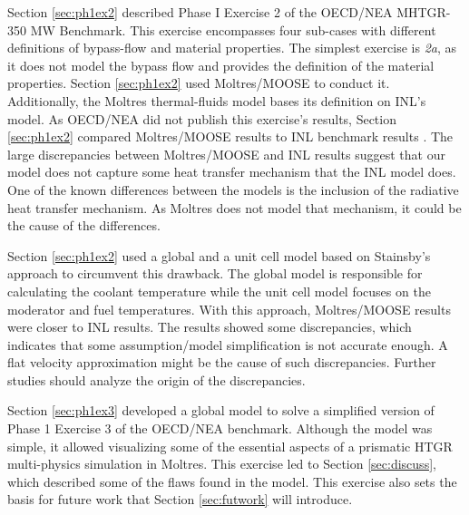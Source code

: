 Section \ref{sec:ph1ex2} described Phase I Exercise 2 of the OECD/NEA MHTGR-350 MW Benchmark.
This exercise encompasses four sub-cases with different definitions of bypass-flow and material properties.
The simplest exercise is \textit{2a}, as it does not model the bypass flow and provides the definition of the material properties.
Section \ref{sec:ph1ex2} used Moltres/MOOSE to conduct it.
Additionally, the Moltres thermal-fluids model bases its definition on INL's model.
As OECD/NEA did not publish this exercise’s results, Section \ref{sec:ph1ex2} compared Moltres/MOOSE results to INL benchmark results \cite{strydom_inl_2013}.
The large discrepancies between Moltres/MOOSE and INL results suggest that our model does not capture some heat transfer mechanism that the INL model does.
One of the known differences between the models is the inclusion of the radiative heat transfer mechanism.
As Moltres does not model that mechanism, it could be the cause of the differences.

Section \ref{sec:ph1ex2} used a global and a unit cell model based on Stainsby's approach \cite{stainsby_investigation_2008} to circumvent this drawback.
The global model is responsible for calculating the coolant temperature while the unit cell model focuses on the moderator and fuel temperatures.
With this approach, Moltres/MOOSE results were closer to INL results.
The results showed some discrepancies, which indicates that some assumption/model simplification is not accurate enough.
A flat velocity approximation might be the cause of such discrepancies.
Further studies should analyze the origin of the discrepancies.

Section \ref{sec:ph1ex3} developed a global model to solve a simplified version of Phase 1 Exercise 3 of the OECD/NEA benchmark.
Although the model was simple, it allowed visualizing some of the essential aspects of a prismatic HTGR multi-physics simulation in Moltres.
This exercise led to Section \ref{sec:discuss}, which described some of the flaws found in the model.
This exercise also sets the basis for future work that Section \ref{sec:futwork} will introduce.